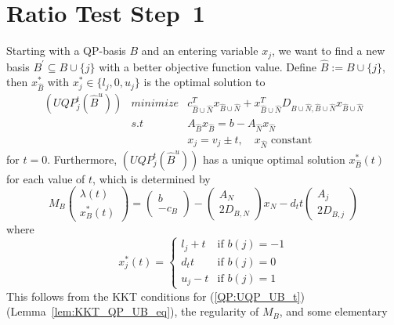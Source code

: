 \documentclass[a4paper]{article}
\begin{document}
\section{Ratio Test Step~1}
Starting with a QP-basis $B$ and an entering variable $x_{j}$, we want to find a
new basis $B^{\prime} \subseteq B \cup \{j\}$ with a better objective function
value. Define $\hat{B}:=B \cup \{j\}$, then $x_{\hat{B}}^{*}$ with
$x_{j}^{*} \in \{l_{j}, 0, u_{j}\}$ is the optimal solution to
\begin{eqnarray}
\label{QP:UQP_UB_t}
(UQP_{j}^{t}(\hat{B}^{u})) & minimize &
  c_{\hat{B} \cup \hat{N}}^{T}x_{\hat{B} \cup \hat{N}}
  + x_{\hat{B} \cup \hat{N}}^{T}
  D_{\hat{B} \cup \hat{N},\hat{B} \cup \hat{N}}
  x_{\hat{B} \cup \hat{N}}  \nonumber \\
  & s.t & A_{\hat{B}}x_{\hat{B}} =
  b - A_{\hat{N}}x_{\hat{N}} \\
  & & x_{j} = v_{j} \pm t, \quad x_{\hat{N}} \text{ constant}
  \nonumber
\end{eqnarray}
for $t=0$. Furthermore, $(UQP_{j}^{t}(\hat{B}^{u}))$ has a unique optimal
solution $x_{\hat{B}}^{*}(t)$ for each value of $t$, which is determined by
\begin{equation}
M_{B}
\left(
\begin{array}{c}
\lambda(t) \\
\hline
x_{B}^{*}(t)
\end{array}
\right)
=
\left(
\begin{array}{c}
b \\
\hline
-c_{B}
\end{array}
\right)
-
\left(
\begin{array}{c}
A_{N} \\
\hline
2D_{B, N}
\end{array}
\right)
x_{N}
-d_{t}t
\left(
\begin{array}{c}
A_{j} \\
\hline
2D_{B, j}
\end{array}
\right)
\end{equation}
where
\begin{equation}
x_{j}^{*}(t)=
\left\{
\begin{array}{ll}
l_{j}+t
&
\text{if $b(j)=-1$} \\
d_{t}t
&
\text{if $b(j)=0$} \\
u_{j}-t
&
\text{if $b(j)=1$}
\end{array}
\right.
\end{equation}
This follows from the KKT conditions for (\ref{QP:UQP_UB_t})
(Lemma~\ref{lem:KKT_QP_UB_eq}), the regularity of $M_{B}$, and some elementary
\end{document}
